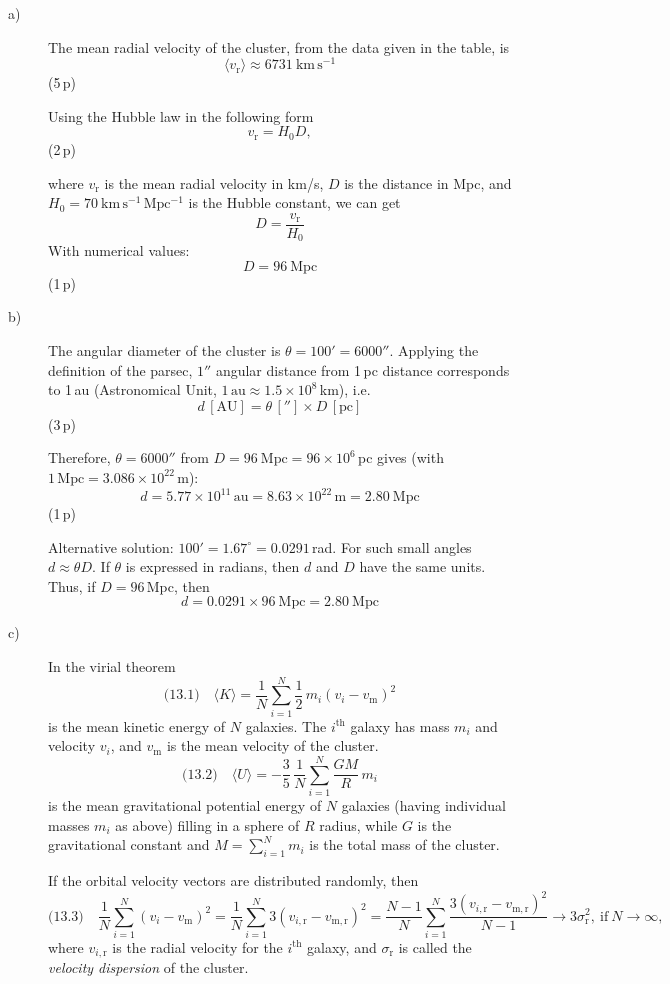 \begin{description}
\item[a)] The mean radial velocity of the cluster, from the data given in
  the table, is
  \[ \langle v_{\mathrm{r}}\rangle \approx 6731\ \mathrm{km\,s^{-1}} \]
  \hfill(5\,p)

  Using the Hubble law in the following form
  \[ v_{\mathrm{r}} = H_0 D, \]
  \hfill(2\,p)

  where $v_{\mathrm{r}}$ is the mean radial velocity in km/s, $D$ is the
  distance in Mpc, and $H_0 = 70\ \mathrm{km\,s^{-1}\,Mpc^{-1}}$ is the
  Hubble constant, we can get
  \[ D = \frac{v_{\mathrm{r}}}{H_0} \]
  With numerical values:
  \[ D = 96\ \mathrm{Mpc} \]
  \hfill(1\,p)

\item[b)] The angular diameter of the cluster is
  $\theta = 100' = 6000''$. Applying the definition of the parsec, $1''$
  angular distance from 1\,pc distance corresponds to 1\,au (Astronomical
  Unit, $1\,\mathrm{au} \approx 1.5\times 10^{8}$\,km), i.e.
  \[ d\,[\mathrm{AU}] = \theta\,['']\times D\,[\mathrm{pc}] \]
  \hfill(3\,p)

  Therefore, $\theta = 6000''$ from
  $D = 96\ \mathrm{Mpc} = 96\times 10^{6}$\,pc gives (with
  $1\,\mathrm{Mpc} = 3.086\times 10^{22}$\,m):
  \[ d = 5.77\times 10^{11}\,\mathrm{au} = 8.63\times 10^{22}\,\mathrm{m}
     = 2.80\ \mathrm{Mpc} \]
  \hfill(1\,p)

  Alternative solution: $100' = 1.67^\circ = 0.0291$\,rad. For such small
  angles $d \approx \theta D$. If $\theta$ is expressed in radians, then
  $d$ and $D$ have the same units. Thus, if $D = 96$\,Mpc, then
  \[ d = 0.0291\times 96\ \mathrm{Mpc} = 2.80\ \mathrm{Mpc} \]

\item[c)] In the virial theorem
  \[ \text{(13.1)}\quad \langle K\rangle
     = \frac{1}{N}\sum_{i=1}^{N}\frac{1}{2}\,m_i(v_i - v_{\mathrm{m}})^2 \]
  is the mean kinetic energy of $N$ galaxies. The $i^{\mathrm{th}}$ galaxy
  has mass $m_i$ and velocity $v_i$, and $v_{\mathrm{m}}$ is the mean
  velocity of the cluster.
  \[ \text{(13.2)}\quad \langle U\rangle
     = -\frac{3}{5}\,\frac{1}{N}\sum_{i=1}^{N}\frac{GM}{R}\,m_i \]
  is the mean gravitational potential energy of $N$ galaxies (having
  individual masses $m_i$ as above) filling in a sphere of $R$ radius,
  while $G$ is the gravitational constant and
  $M = \sum_{i=1}^{N} m_i$ is the total mass of the cluster.

  If the orbital velocity vectors are distributed randomly, then
  \[ \text{(13.3)}\quad
     \frac{1}{N}\sum_{i=1}^{N}(v_i - v_{\mathrm{m}})^2
     = \frac{1}{N}\sum_{i=1}^{N} 3(v_{i,\mathrm{r}} - v_{\mathrm{m,r}})^2
     = \frac{N-1}{N}\sum_{i=1}^{N}
       \frac{3(v_{i,\mathrm{r}} - v_{\mathrm{m,r}})^2}{N-1}
     \to 3\sigma_{\mathrm{r}}^2,\ \text{if}\ N\to\infty, \]
  where $v_{i,\mathrm{r}}$ is the radial velocity for the
  $i^{\mathrm{th}}$ galaxy, and $\sigma_{\mathrm{r}}$ is called the
  \emph{velocity dispersion} of the cluster.


\end{description}
